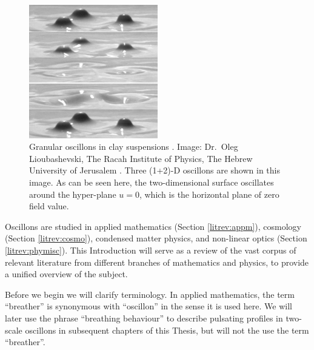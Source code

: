 \documentclass[11pt]{book}
\begin{document}
\begin{figure}\centering
  \includegraphics[width=0.5\textwidth]{plot/oscillon-non-newton.jpg}
  \caption{Granular oscillons in clay suspensions \cite{PhysRevLett.83.3190}. Image: Dr.~Oleg Lioubashevski, The Racah Institute of Physics, The Hebrew University of Jerusalem \cite{blazelab}. Three (1+2)-D oscillons are shown in this image. As can be seen here, the two-dimensional surface oscillates around the hyper-plane $u=0$, which is the horizontal plane of zero field value.}
  \label{nntliquid}
\end{figure}

Oscillons are studied in applied mathematics (Section \ref{litrev:appm}), cosmology (Section \ref{litrev:cosmo}), condensed matter physics, and non-linear optics (Section \ref{litrev:phymisc}). This Introduction will serve as a review of the vast corpus of relevant literature from different branches of mathematics and physics, to provide a unified overview of the subject.

Before we begin we will clarify terminology. In applied mathematics, the term ``breather'' is synonymous with ``oscillon'' in the sense it is used here. We will later use the phrase ``breathing behaviour'' to describe pulsating profiles in two-scale oscillons in subsequent chapters of this Thesis, but will not the use the term ``breather''.
\end{document}
